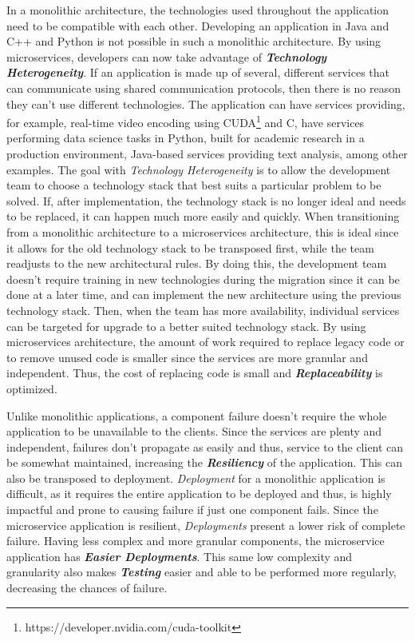 In a monolithic architecture, the technologies used throughout the application need to be compatible with each other. Developing an application in Java and C++ and Python is not possible in such a monolithic architecture. 
By using microservices, developers can now take advantage of \textbf{\textit{Technology Heterogeneity}}. If an application is made up of several, different services that can communicate using shared communication protocols, then there is no reason they can't use different technologies. The application can have services providing, for example, real-time video encoding using CUDA\footnote{\label{foot:cuda}https://developer.nvidia.com/cuda-toolkit} and C, have services performing data science tasks in Python, built for academic research in a production environment, Java-based services providing text analysis, among other examples. The goal with \textit{Technology Heterogeneity} is to allow the development team to choose a technology stack that best suits a particular problem to be solved. If, after implementation, the technology stack is no longer ideal and needs to be replaced, it can happen much more easily and quickly. When transitioning from a monolithic architecture to a microservices architecture, this is ideal since it allows for the old technology stack to be transposed first, while the team readjusts to the new architectural rules. By doing this, the development team doesn't require training in new technologies during the migration since it can be done at a later time, and can implement the new architecture using the previous technology stack. Then, when the team has more availability, individual services can be targeted for upgrade to a better suited technology stack. By using microservices architecture, the amount of work required to replace legacy code or to remove unused code is smaller since the services are more granular and independent. Thus, the cost of replacing code is small and \textbf{\textit{Replaceability}} is optimized.

Unlike monolithic applications, a component failure doesn't require the whole application to be unavailable to the clients. Since the services are plenty and independent, failures don't propagate as easily and thus, service to the client can be somewhat maintained, increasing the \textbf{\textit{Resiliency}} of the application. This can also be transposed to deployment. \textit{Deployment} for a monolithic application is difficult, as it requires the entire application to be deployed and thus, is highly impactful and prone to causing failure if just one component fails. Since the microservice application is resilient, \textit{Deployments} present a lower risk of complete failure. Having less complex and more granular components, the microservice application has \textbf{\textit{Easier Deployments}}. This same low complexity and granularity also makes \textbf{\textit{Testing}} easier and able to be performed more regularly, decreasing the chances of failure. 

